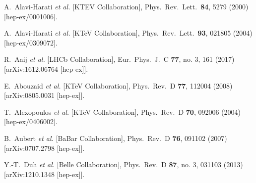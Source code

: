 \documentclass[preprint,prd,aps,tighten,nofootinbib,amssymb]{revtex4}
\begin{document}
\begin{thebibliography}{99}
  A.~Alavi-Harati {\it et al.} [KTEV Collaboration],
  Phys.\ Rev.\ Lett.\  {\bf 84}, 5279 (2000)
  [hep-ex/0001006].
  
  A.~Alavi-Harati {\it et al.} [KTeV Collaboration],
  Phys.\ Rev.\ Lett.\  {\bf 93}, 021805 (2004)
  [hep-ex/0309072].
  
  R.~Aaij {\it et al.} [LHCb Collaboration],
  Eur.\ Phys.\ J.\ C {\bf 77}, no. 3, 161 (2017)
  [arXiv:1612.06764 [hep-ex]].
  
  E.~Abouzaid {\it et al.} [KTeV Collaboration],
  Phys.\ Rev.\ D {\bf 77}, 112004 (2008)
  [arXiv:0805.0031 [hep-ex]].
  
  T.~Alexopoulos {\it et al.} [KTeV Collaboration],
  Phys.\ Rev.\ D {\bf 70}, 092006 (2004)
  [hep-ex/0406002].
  
  B.~Aubert {\it et al.} [BaBar Collaboration],
  Phys.\ Rev.\ D {\bf 76}, 091102 (2007)
  [arXiv:0707.2798 [hep-ex]].
  
  Y.-T.~Duh {\it et al.} [Belle Collaboration],
  Phys.\ Rev.\ D {\bf 87}, no. 3, 031103 (2013)
  [arXiv:1210.1348 [hep-ex]].
  

\end{thebibliography}
\end{document}
